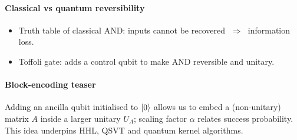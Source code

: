 \paragraph{Classical vs quantum reversibility}
\begin{itemize}
	\item Truth table of classical \textsc{AND}: inputs cannot be recovered $\;\Rightarrow\;$ information loss.  
	\item Toffoli gate: adds a control qubit to make \textsc{AND} reversible and unitary.  
\end{itemize}

\paragraph{Block-encoding teaser}
Adding an ancilla qubit initialised to $\ket{0}$ allows us to embed a (non-unitary) matrix $A$ 
inside a larger unitary $U_{A}$; scaling factor $\alpha$ relates success probability.  
This idea underpins HHL, QSVT and quantum kernel algorithms.

\vspace{0.5em}


